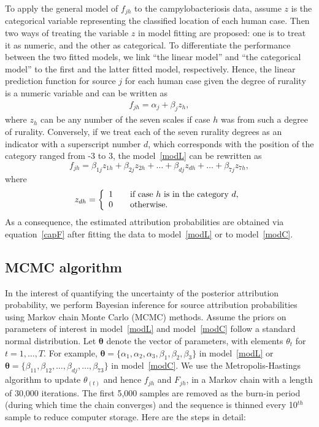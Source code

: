 \documentclass[times, doublespace]{simauth}%
\begin{document}
To apply the general model of $f_{jh}$ to the campylobacteriosis data, assume $z$ is the categorical variable representing the classified location of each human case. Then two ways of treating the variable $z$ in model fitting are proposed: one is to treat it as numeric, and the other as categorical. To differentiate the performance between the two fitted models, we link ``the linear model'' and ``the categorical model'' to the first and the latter fitted model, respectively. Hence, the linear prediction function for source $j$ for each human case given the degree of rurality is a numeric variable and can be written as
\begin{align}
  f_{jh} = \alpha_{j} + \beta_{j} z_{h},
  \label{modL}
\end{align}
where $z_{h}$ can be any number of the seven scales if case $h$ was from such a degree of rurality. Conversely, if we treat each of the seven rurality degrees as an indicator with a superscript number $d$, which corresponds with the position of the category ranged from -3 to 3, the model~\eqref{modL} can be rewritten as
\begin{equation}
  f_{jh} = \beta_{1j} z_{1h}+ \beta_{2j} z_{2h} + \ldots + \beta_{dj} z_{dh} + \ldots +  \beta_{7j} z_{7h},
  \label{modC}
\end{equation}
where
\begin{equation*}
z_{dh} =
\left\{\begin{array}{rcl}
1 && \mbox{if case $h$ is in the category $d$,} \notag \\ 0 && \mbox{otherwise}. 
\end{array}\right.
\end{equation*}
As a consequence, the estimated attribution probabilities are obtained via equation~\eqref{capF} after fitting the data to model~\eqref{modL} or to model~\eqref{modC}.

\subsection{MCMC algorithm}
In the interest of quantifying the uncertainty of the posterior attribution probability, we perform Bayesian inference for source attribution probabilities using Markov chain Monte Carlo (MCMC) methods. Assume the priors on parameters of interest in model~\eqref{modL} and model~\eqref{modC} follow a standard normal distribution. Let $\boldsymbol{\theta}$ denote the vector of parameters, with elements $\theta_{t}$ for $t=1, \ldots, T$. For example, $\boldsymbol{\theta}=\{\alpha_1, \alpha_2, \alpha_3, \beta_1, \beta_2, \beta_3\}$ in model~\eqref{modL} or $\boldsymbol{\theta}=\{\beta_{11}, \beta_{12}, \ldots, \beta_{dj}, \ldots, \beta_{73}\}$ in model~\eqref{modC}. We use the Metropolis-Hastings algorithm to update $\theta_{(t)}$ and hence $f_{jh}$ and $ F_{jh}$, in a Markov chain with a length of 30,000 iterations. The first 5,000 samples are removed as the burn-in period (during which time the chain converges) and the sequence is thinned every 10$^{th}$ sample to reduce computer storage. Here are the steps in detail:
\end{document}
